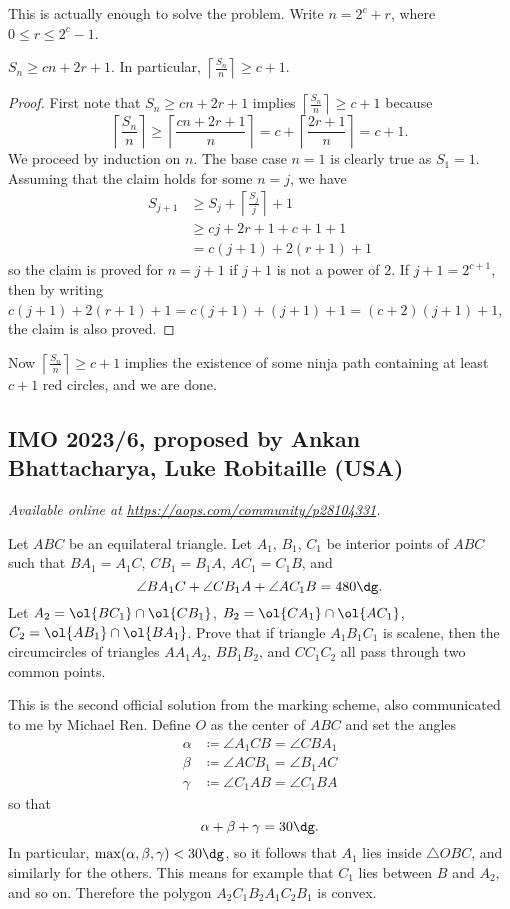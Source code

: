 \documentclass[11pt]{scrartcl}
\begin{document}
This is actually enough to solve the problem.
Write $n = 2^c + r$, where $0 \leq r \leq 2^c - 1$.
\begin{claim*}
$S_n \geq cn + 2r + 1$. In particular, $\left\lceil \frac{S_n}{n} \right\rceil \geq c + 1$.
\end{claim*}

\begin{proof}
First note that $S_n \geq cn + 2r + 1$ implies
$\left\lceil \frac{S_n}{n} \right\rceil \geq c + 1$ because
\[ \left\lceil \frac{S_n}{n} \right\rceil \geq \left\lceil \frac{cn + 2r + 1}{n} \right\rceil
= c + \left\lceil \frac{2r + 1}{n} \right\rceil = c + 1.
\]
We proceed by induction on $n$.
The base case $n = 1$ is clearly true as $S_1 = 1$.
Assuming that the claim holds for some $n=j$, we have
\begin{align*}
    S_{j+1} &\geq S_j + \left\lceil \frac{S_j}{j} \right\rceil + 1 \\
    &\geq cj + 2r + 1 + c + 1 + 1 \\
    &= c(j+1) + 2(r+1) + 1
\end{align*}
so the claim is proved for $n=j+1$ if $j+1$ is not a power of $2$.
If $j+1 = 2^{c+1}$, then by writing
$c(j+1) + 2(r+1) + 1 = c(j+1) + (j+1) + 1 = (c+2)(j+1) + 1$, the claim is also proved.
\end{proof}

Now $\left\lceil \frac{S_n}{n} \right\rceil \geq c + 1$ implies the existence of
some ninja path containing at least $c+1$ red circles, and we are done.
\pagebreak

\subsection{IMO 2023/6, proposed by Ankan Bhattacharya, Luke Robitaille (USA)}
\textsl{Available online at \url{https://aops.com/community/p28104331}.}
\begin{mdframed}[style=mdpurplebox,frametitle={Problem statement}]
Let $ABC$ be an equilateral triangle.
Let $A_1$, $B_1$, $C_1$ be interior points of $ABC$
such that $BA_1=A_1C$, $CB_1=B_1A$, $AC_1=C_1B$, and
\[ \angle BA_1C + \angle CB_1A + \angle AC_1B = 480\dg. \]
Let $A_2 = \ol{BC_1} \cap \ol{CB_1}$, $B_2 = \ol{CA_1} \cap \ol{AC_1}$,
$C_2 = \ol{AB_1} \cap \ol{BA_1}$.
Prove that if triangle $A_1B_1C_1$ is scalene,
then the circumcircles of triangles $AA_1A_2$, $BB_1B_2$, and $CC_1C_2$
all pass through two common points.
\end{mdframed}
This is the second official solution from the marking scheme,
also communicated to me by Michael Ren.
Define $O$ as the center of $ABC$ and set the angles
\begin{align*}
  \alpha &\coloneqq \angle A_1CB = \angle CBA_1 \\
  \beta &\coloneqq \angle ACB_1 = \angle B_1AC \\
  \gamma &\coloneqq \angle C_1AB = \angle C_1BA
\end{align*}
so that
\[ \alpha + \beta + \gamma = 30\dg. \]
In particular, $\max(\alpha,\beta,\gamma) < 30\dg$,
so it follows that $A_1$ lies inside $\triangle OBC$, and similarly for the others.
This means for example that $C_1$ lies between $B$ and $A_2$, and so on.
Therefore the polygon $A_2C_1B_2A_1C_2B_1$ is convex.
\end{document}
